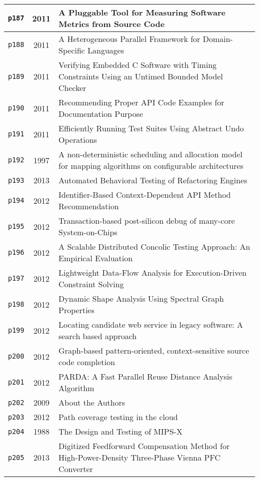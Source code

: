 \begin{longtable}{| c | c | p{16cm} |}
  \hline
  \texttt{p187} & 2011 & A Pluggable Tool for Measuring Software Metrics from Source Code \\
  \hline
  \texttt{p188} & 2011 & A Heterogeneous Parallel Framework for Domain-Specific Languages \\
  \hline
  \texttt{p189} & 2011 & Verifying Embedded C Software with Timing Constraints Using an Untimed Bounded Model Checker \\
  \hline
  \texttt{p190} & 2011 & Recommending Proper API Code Examples for Documentation Purpose \\
  \hline
  \texttt{p191} & 2011 & Efficiently Running Test Suites Using Abstract Undo Operations \\
  \hline
  \texttt{p192} & 1997 & A non-deterministic scheduling and allocation model for mapping algorithms on configurable architectures \\
  \hline
  \texttt{p193} & 2013 & Automated Behavioral Testing of Refactoring Engines \\
  \hline
  \texttt{p194} & 2012 & Identifier-Based Context-Dependent API Method Recommendation \\
  \hline
  \texttt{p195} & 2012 & Transaction-based post-silicon debug of many-core System-on-Chips \\
  \hline
  \texttt{p196} & 2012 & A Scalable Distributed Concolic Testing Approach: An Empirical Evaluation \\
  \hline
  \texttt{p197} & 2012 & Lightweight Data-Flow Analysis for Execution-Driven Constraint Solving \\
  \hline
  \texttt{p198} & 2012 & Dynamic Shape Analysis Using Spectral Graph Properties \\
  \hline
  \texttt{p199} & 2012 & Locating candidate web service in legacy software: A search based approach \\
  \hline
  \texttt{p200} & 2012 & Graph-based pattern-oriented, context-sensitive source code completion \\
  \hline
  \texttt{p201} & 2012 & PARDA: A Fast Parallel Reuse Distance Analysis Algorithm \\
  \hline
  \texttt{p202} & 2009 & About the Authors \\
  \hline
  \texttt{p203} & 2012 & Path coverage testing in the cloud \\
  \hline
  \texttt{p204} & 1988 & The Design and Testing of MIPS-X \\
  \hline
  \texttt{p205} & 2013 & Digitized Feedforward Compensation Method for High-Power-Density Three-Phase Vienna PFC Converter \\

\end{longtable}

